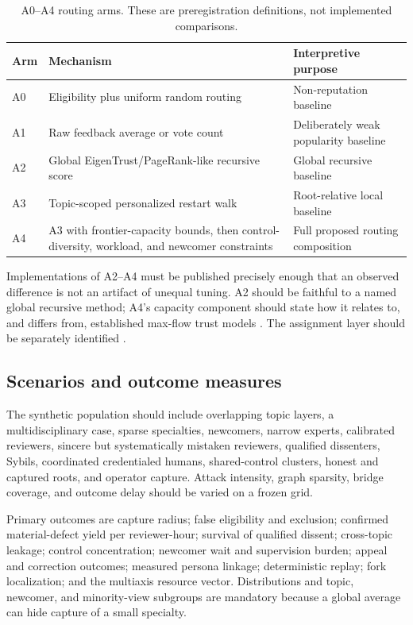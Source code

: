 \documentclass[11pt]{article}
\begin{document}
\begin{table}[H]
\centering
\caption{A0--A4 routing arms. These are preregistration definitions, not implemented
comparisons.}
\label{tab:arms}
\small
\begin{tabularx}{\textwidth}{p{}p{}X}
\toprule Arm & Mechanism & Interpretive purpose \\
\midrule
A0 & Eligibility plus uniform random routing & Non-reputation baseline \\
A1 & Raw feedback average or vote count & Deliberately weak popularity baseline \\
A2 & Global EigenTrust/PageRank-like recursive score & Global recursive baseline \\
A3 & Topic-scoped personalized restart walk & Root-relative local baseline \\
A4 & A3 with frontier-capacity bounds, then control-diversity, workload, and newcomer constraints & Full proposed routing composition \\
\bottomrule
\end{tabularx}
\end{table}

Implementations of A2--A4 must be published precisely enough that an observed
difference is not an artifact of unequal tuning. A2 should be faithful to a named
global recursive method; A4's capacity component should state how it relates to,
and differs from, established max-flow trust models
\citep{kamvar2003eigentrust,levien1998attack}. The assignment layer should be
separately identified \citep{stelmakh2021peerreview4all,jecmen2020mitigating}.

\subsection{Scenarios and outcome measures}

The synthetic population should include overlapping topic layers, a
multidisciplinary case, sparse specialties, newcomers, narrow experts, calibrated
reviewers, sincere but systematically mistaken reviewers, qualified dissenters,
Sybils, coordinated credentialed humans, shared-control clusters, honest and
captured roots, and operator capture. Attack intensity, graph sparsity, bridge
coverage, and outcome delay should be varied on a frozen grid.

Primary outcomes are capture radius; false eligibility and exclusion; confirmed
material-defect yield per reviewer-hour; survival of qualified dissent; cross-topic
leakage; control concentration; newcomer wait and supervision burden; appeal and
correction outcomes; measured persona linkage; deterministic replay; fork
localization; and the multiaxis resource vector. Distributions and topic,
newcomer, and minority-view subgroups are mandatory because a global average can
hide capture of a small specialty.
\end{document}
